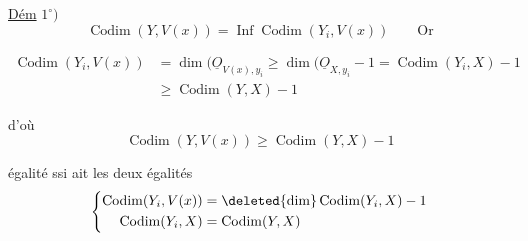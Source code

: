 \uline{Dém} $1^\circ)$
\[
\operatorname{Codim}(Y,V(x))=\mathop{\mathrm{Inf}}\operatorname{Codim}(Y_i,V(x))\qquad\text{Or}
\]

\[
\begin{aligned}
\operatorname{Codim}(Y_i,V(x))&=\dim(\underline O_{V(x),y_i}\geq\dim(\underline O_{X,y_i}-1=\operatorname{Codim}(Y_i,X)-1\\
&\geq\operatorname{Codim}(Y,X)-1
\end{aligned}
\]

d'où
\[
\operatorname{Codim}(Y,V(x))\geq\operatorname{Codim}(Y,X)-1
\]

égalité ssi   ait les deux égalités
\[
\left\{\begin{aligned}
\operatorname{Codim}(Y_i,V(x))&=\deleted{\dim}\operatorname{Codim}(Y_i,X)-1\\
\operatorname{Codim}(Y_i,X)&=\operatorname{Codim}(Y,X)
\end{aligned}\right.
\]

